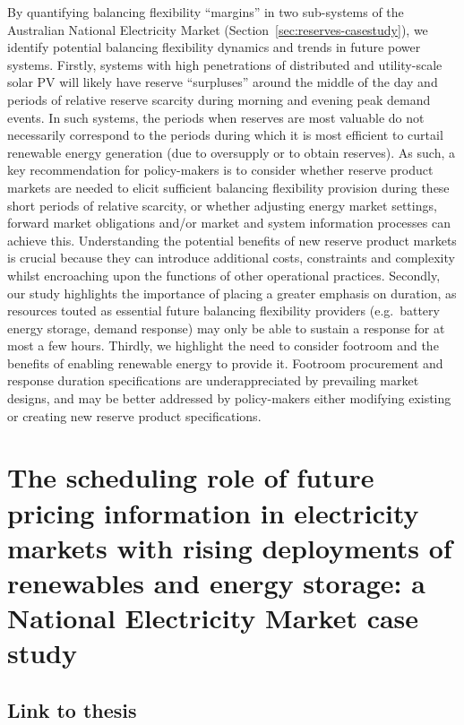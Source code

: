 \documentclass[12pt,a4paper,]{report}
\begin{document}
By quantifying balancing flexibility ``margins'' in two sub-systems of
the Australian National Electricity Market
(Section~\ref{sec:reserves-casestudy}), we identify potential balancing
flexibility dynamics and trends in future power systems. Firstly,
systems with high penetrations of distributed and utility-scale solar PV
will likely have reserve ``surpluses'' around the middle of the day and
periods of relative reserve scarcity during morning and evening peak
demand events. In such systems, the periods when reserves are most
valuable do not necessarily correspond to the periods during which it is
most efficient to curtail renewable energy generation (due to oversupply
or to obtain reserves). As such, a key recommendation for policy-makers
is to consider whether reserve product markets are needed to elicit
sufficient balancing flexibility provision during these short periods of
relative scarcity, or whether adjusting energy market settings, forward
market obligations and/or market and system information processes can
achieve this. Understanding the potential benefits of new reserve
product markets is crucial because they can introduce additional costs,
constraints and complexity whilst encroaching upon the functions of
other operational practices. Secondly, our study highlights the
importance of placing a greater emphasis on duration, as resources
touted as essential future balancing flexibility providers (e.g.~battery
energy storage, demand response) may only be able to sustain a response
for at most a few hours. Thirdly, we highlight the need to consider
footroom and the benefits of enabling renewable energy to provide it.
Footroom procurement and response duration specifications are
underappreciated by prevailing market designs, and may be better
addressed by policy-makers either modifying existing or creating new
reserve product specifications.

\hypertarget{sec:info}{%
\chapter{The scheduling role of future pricing information in
electricity markets with rising deployments of renewables and energy
storage: a National Electricity Market case study}\label{sec:info}}

\hypertarget{link-to-thesis-2}{%
\section{Link to thesis}\label{link-to-thesis-2}}
\end{document}
